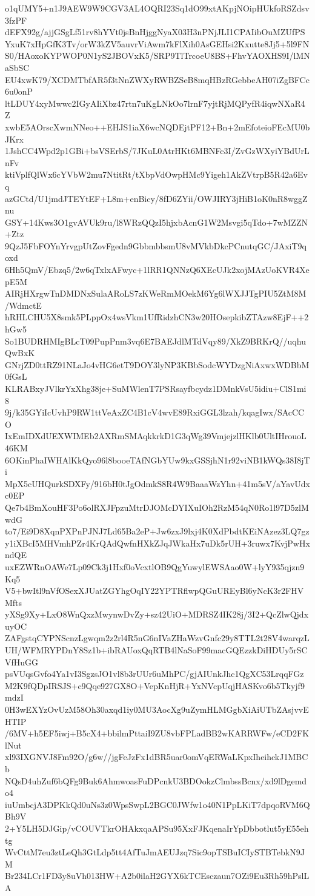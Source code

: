 o1qUMY5+n1J9AEW9W9CGV3AL4OQRI23Sq1dO99xtAKpjNOipHUkfoRSZdsv3fzPF
dEFX92g/ajjGSgLf51rv8hYVt0jsBnHjggNyaX03H3nPNjJLI1CPAIibOuMZUfPS
YxuK7xHpGfK3Tv/orW3kZV5auvrViAwm7kFlXih0AsGEHsi2Kxutte8Jj5+5l9FN
S0/HAoxoKYPWOP0N1yS2JBOVxK5/SRP9TlTrcoeU8BS+FhvYAOXHS9I/lMNaSbSC
EU4xwK79/XCDMTbfAR5f3tNnZWXyRWBZSeB8mqHBzRGebbeAH07iZgBFCc6u0onP
ltLDUY4xyMwwc2IGyAIiXbz47rtn7uKgLNkOo7lrnF7yjtRjMQPyfR4iqwNXaR4Z
xwbE5AOrscXwmNNeo++EHJS1iaX6wcNQDEjtPF12+Bn+2mEfoteioFEcMU0bJKrx
1JshCC4Wpd2p1GBi+bsVSErbS/7JKuL0AtrHKt6MBNFc3I/ZvGzWXyiYBdUrLnFv
ktiVplfQlWx6cYVbW2mu7NtitRt/tXbpVdOwpHMc9Yigeh1AkZVtrpB5R42a6Evq
azGCtd/U1jmdJTEYtEF+L8m+enBicy/8fD6ZYii/OWJIRY3jHiB1oK0nR8wggZnu
GSY+14Kws3O1gvAVUk9ru/l8WRzQQzI5hjxbAcnG1W2Msvgi5qTdo+7wMZZN+Ztz
9QzJ5FbFOYnYrvgpUtZovFgedn9GbbmbbsmU8vMVkbDkcPCnutqGC/JAxiT9qoxd
6Hh5QmV/Ebzq5/2w6qTxlxAFwyc+1lRR1QNNzQ6XEcUJk2xojMAzUoKVR4XepE5M
AIRjHXrgwTnDMDNxSulaARoLS7zKWeRmMOekM6Yg6lWXJJTgPIU5ZtM8M/WdmctE
hRHLCHU5X8smk5PLppOx4wsVkm1UfRidzhCN3w20HOsepkibZTAzw8EjF++2hGw5
So1BUDRHMIgBLcT09PupPnm3vq6E7BAEJdlMTdVqy89/XkZ9BRKrQ//uqhuQwBxK
GNrjZD0ttRZ91NLaJo4vHG6etT9DOY3lyNP3KBbSodcWYDzgNiAxwxWDBbM0fGsL
KLRABxyJVlkrYxXhg38je+SuMWlenT7PSRsayfbcydz1DMnkVsU5idiu+ClS1mi8
9j/k35GYiIcUvhP9RW1ttVeAxZC4B1cV4wvE89RxiGGL3lzah/kqagIwx/SAcCCO
IxEmIDXdUEXWIMEb2AXRmSMAqkkrkD1G3qWg39VmjejzlHKlb0UltIHrouoL46KM
6OKinPhaIWHAlKkQyo96l8booeTAfNGbYUw9kxGSSjhN1r92viNB1kWQs38I8jTi
MpX5cUHQurkSDXFy/916bH0tJgOdmkS8R4W9BaaaWzYhn+41m5sV/aYavUdxc0EP
Qe7b4BmXouHF3Po6olRXJFpzuMtrDJOMcDYIXuIOh2RzM54qN0Ro1l97D5zlMwdG
to7/Ei9D8XqnPXPnPJNJ7Ld65Ba2eP+Jw6zxJ9lxj4K0XdPbdtKEiNAzez3LQ7gz
y1iXBcI5MHVmhPZr4KrQAdQwfnHXkZJqJWkaHx7uDk5rUH+3ruwx7KvjPwHxndQE
uxEZWRnOAWe7Lp09Ck3j1Hxf0oVcxtlOB9QgYuwylEWSAao0W+lyY935qjzn9Kq5
V5+bwItl9nVfOSexXJUatZGYhgOqIY22YPTRflwpQGuUREyBl6yNcK3r2FHVMfts
yXSg9Xy+LxO8WnQxzMwynwDvZy+sz42UiO+MDRSZ4IK28j/3I2+QcZlwQjdxuyOC
ZAFgstqCYPNScnzLgwqm2z2rl4R5nG6nIVaZHaWzvGnfc29y8TTL2t28V4warqzL
UH/WFMRYPDnY8Sz1b+ibRAUoxQqRTB4lNaSoF99macGQEzzkDiHDUy5rSCVfHuGG
psVUqsGvfo4Ya1vI3SgzsJO1vl8b3rUUr6uMhPC/gjAIUnkJhc1QgXC53LrqqFGz
M2K9fQDpIRSJS+c9Qqe927GX8O+VepKnHjR+YxNVcpUqjHASKvo6b5Tkyjf9mdzI
0H3wEXYzOvUzM58Oh30axqd1iy0MU3AocXg9uZymHLMGgbXiAiUTbZAsjvvEHTIP
/6MV+h5EF5iwj+B5cX4+bbilmPttaiI9ZU8vbFPLadBB2wKARRWFw/eCD2FKlNut
xl93IXGNVJ8Fm92O/g6w//jgFeJzFx1dBR5uar0omVqERWaLKpxIheihckJ1MBCb
NQsD4uhZuf6bQFg9Buk6AhmwoasFuDPcnkU3BDOokzClmbssBcnx/xd9lDgemdo4
iuUmbcjA3DPKkQd0uNs3z0WpsSwpL2BGC0JWfw1o40N1PpLKiT7dpqoRVM6QBh9V
2+Y5LH5DJGip/vCOUVTkrOHAkxqaAPSu95XxFJKqenaIrYpDbbotlut5yE55ehtg
WvCttM7eu3ztLeQh3GtLdp5tt4AfTuJmAEUJzq7Sic9opTSBuICIySTBTebkN9JM
Br234LCr1FD3y8uVh013HW+A2b0ilaH2GYX6kTCEsczaun7OZi9Eu3Rh59hPslLA
